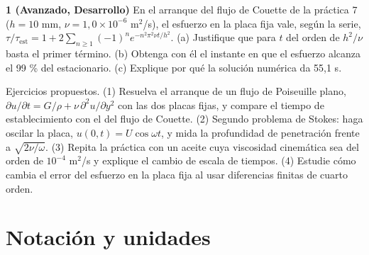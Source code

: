 \documentclass[10pt,openany]{book}
\begin{document}
\begin{tcolorbox}[title={Ejercicios propuestos}, studiumworked, breakable]

\noindent\textbf{1 (Avanzado, Desarrollo)}
En el arranque del flujo de Couette de la práctica 7 (\(h = 10\) mm, \(\nu = 1{,}0\times 10^{-6}\) m\(^2\)/s), el esfuerzo en la placa fija vale, según la serie, \(\tau/\tau_{\mathrm{est}} = 1 + 2\sum_{n\ge 1}(-1)^{n}e^{-n^{2}\pi^{2}\nu t/h^{2}}\). (a) Justifique que para \(t\) del orden de \(h^{2}/\nu\) basta el primer término. (b) Obtenga con él el instante en que el esfuerzo alcanza el 99 \% del estacionario. (c) Explique por qué la solución numérica da 55,1 s.
\end{tcolorbox}

\begin{tcolorbox}[title={Autoevaluación}, studiumcheck, breakable]

Ejercicios propuestos. (1) Resuelva el arranque de un flujo de Poiseuille plano, \(\partial u/\partial t = G/\rho + \nu\,\partial^{2}u/\partial y^{2}\) con las dos placas fijas, y compare el tiempo de establecimiento con el del flujo de Couette. (2) Segundo problema de Stokes: haga oscilar la placa, \(u(0, t) = U\cos\omega t\), y mida la profundidad de penetración frente a \(\sqrt{2\nu/\omega}\). (3) Repita la práctica con un aceite cuya viscosidad cinemática sea del orden de \(10^{-4}\) m\(^2\)/s y explique el cambio de escala de tiempos. (4) Estudie cómo cambia el error del esfuerzo en la placa fija al usar diferencias finitas de cuarto orden.
\end{tcolorbox}
\studiumchaptercheck

\appendix
\chapter{Notación y unidades}
\end{document}

